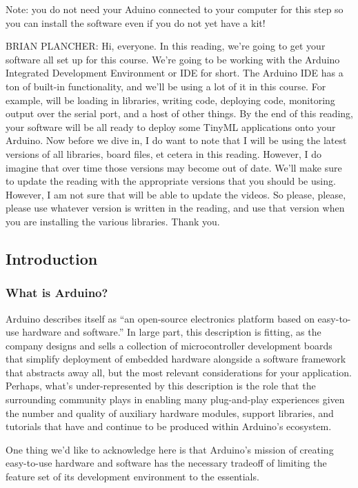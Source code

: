 Note: you do not need your Aduino connected to your computer for this step so you can install the software even if you do not yet have a kit!

BRIAN PLANCHER: Hi, everyone.
In this reading, we're going to get your software all set up for this course.
We're going to be working with the Arduino Integrated Development
Environment or IDE for short.
The Arduino IDE has a ton of built-in functionality,
and we'll be using a lot of it in this course.
For example, will be loading in libraries, writing code,
deploying code, monitoring output over the serial port,
and a host of other things.
By the end of this reading, your software
will be all ready to deploy some TinyML applications onto your Arduino.
Now before we dive in, I do want to note that I
will be using the latest versions of all libraries, board files,
et cetera in this reading.
However, I do imagine that over time those versions may become out of date.
We'll make sure to update the reading with the appropriate versions
that you should be using.
However, I am not sure that will be able to update the videos.
So please, please, please use whatever version is written in the reading,
and use that version when you are installing the various libraries.
Thank you.

\subsection{Introduction}

\subsubsection{What is Arduino?}

    Arduino describes itself as “an open-source electronics platform based on easy-to-use hardware and software.” In large part, this description is fitting, as the company designs and sells a collection of microcontroller development boards that simplify deployment of embedded hardware alongside a software framework that abstracts away all, but the most relevant considerations for your application. Perhaps, what’s under-represented by this description is the role that the surrounding community plays in enabling many plug-and-play experiences given the number and quality of auxiliary hardware modules, support libraries, and tutorials that have and continue to be produced within Arduino’s ecosystem.
    
    One thing we’d like to acknowledge here is that Arduino’s mission of creating easy-to-use hardware and software has the necessary tradeoff of limiting the feature set of its development environment to the essentials.
    
